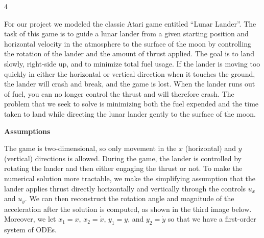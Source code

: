 \documentclass[a0]{4by3}
\newcommand{\NumColumns}{4}
\begin{document}
\centering
{}


\color{black}
\noindent
\begin{minipage}{\linewidth + 2\fboxsep}
\begin{multicols*}{\NumColumns}


        \Large
    \color{white}
       For our project we modeled the classic Atari game entitled ``Lunar Lander''.
       The task of this game is to guide a lunar lander from a given starting position and horizontal velocity in the atmosphere to the surface of the moon by controlling the rotation of the lander and the amount of thrust applied. The goal is to land slowly, right-side up, and to minimize total fuel usage.
       If the lander is moving too quickly in either the horizontal or vertical direction when it touches the ground, the lander will crash and break, and the game is lost. When the lander runs out of fuel, you can no longer control the thrust and will therefore crash. The problem that we seek to solve is minimizing both the fuel expended and the time taken to land while directing the lunar lander gently to the surface of the moon.
       






    
        
        \begin{tcolorbox}
        \begin{center}
        \color{white}
            {\ocra\LARGE{\textbf{Assumptions}}}
        \end{center}
        \end{tcolorbox}
        \vspace{5mm}
            \Large
            The game is two-dimensional, so only movement in the $x$ (horizontal) and $y$ (vertical) directions is allowed.
            During the game, the lander is controlled by rotating the lander and then either engaging the thrust or not.
            To make the numerical solution more tractable, we make the simplifying assumption that the lander applies thrust directly horizontally and vertically through the controls $u_x$ and $u_y$. We can then reconstruct the rotation angle and magnitude of the acceleration after the solution is computed, as shown in the third image below.
            Moreover, we let $x_1 = x$, $x_2 = \dot{x}$, $y_1 = y$, and $y_2 = \dot{y}$ so that we have a first-order system of ODEs.
            

\end{multicols*}
\end{minipage}
\end{document}
